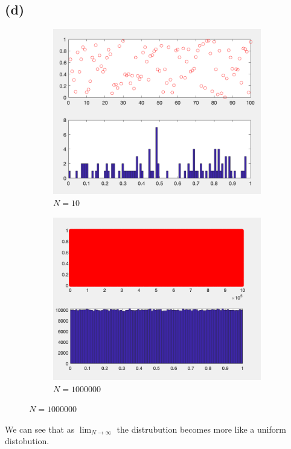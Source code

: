 \documentclass{article}
\begin{document}
\subsection{(d)}
\begin{figure}[H]
    \begin{subfigure}[h]{0.45\linewidth}
        \includegraphics[width=\linewidth]{imgs/q1d_100.png}
        \caption{\( N=10 \)}
    \end{subfigure}
    \hfill
    \begin{subfigure}[h]{0.45\linewidth}
        \includegraphics[width=\linewidth]{imgs/q1d_1000000.png}
        \caption{\( N=1000000\)}
    \end{subfigure}
\end{figure}
We can see that as \( \lim_{N\to \infty}\) the distrubution becomes more like a uniform distobution. 
\end{document}
